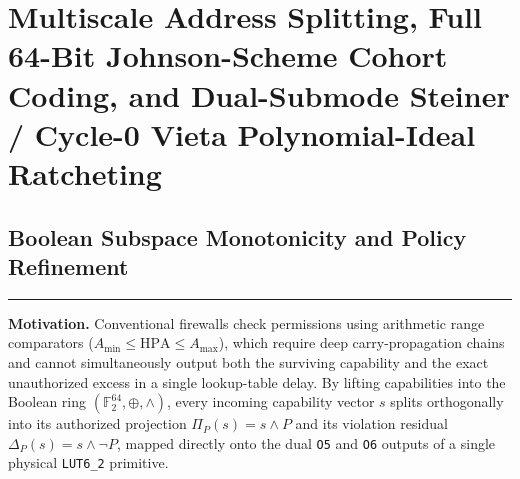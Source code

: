 \documentclass[10pt,twocolumn]{article}
\makeatletter
\newif\ifspecintwocol \specintwocolfalse
\newif\ifspecresume   \specresumefalse
\newcommand{\StopTwoCol}{%
  \if@twocolumn
    \onecolumn
    \global\specintwocolfalse
    \let\spec@next\@empty
  \else
    \ifspecintwocol
      \global\specintwocolfalse
      \def\spec@next{\end{multicols}}%
    \else
      \let\spec@next\@empty
    \fi
  \fi
  \spec@next
}
\newcommand{\BeginConnesPlate}{%
  \if@twocolumn
    \onecolumn
    \global\specresumetrue
    \let\spec@platepre\@empty
  \else
    \ifspecintwocol
      \global\specresumetrue
      \let\spec@platepre\StopTwoCol
    \else
      \global\specresumefalse
      \let\spec@platepre\@empty
    \fi
  \fi
  \spec@platepre
  \par\vspace{4pt}\noindent\textcolor{black!25}{\rule{\textwidth}{0.4pt}}\par\vspace{3pt}%
}
\theoremstyle{spectralthm}
\makeatother
\begin{document}
\StopTwoCol
\section{Multiscale Address Splitting, Full 64-Bit Johnson-Scheme Cohort Coding, and Dual-Submode Steiner / Cycle-0 Vieta Polynomial-Ideal Ratcheting}
\label{sec:multiscale}

\subsection{Boolean Subspace Monotonicity and Policy Refinement}
\BeginConnesPlate
\noindent\textbf{Motivation.}\; Conventional firewalls check permissions using arithmetic range comparators ($A_{\min} \le \mathrm{HPA} \le A_{\max}$), which require deep carry-propagation chains and cannot simultaneously output both the surviving capability and the exact unauthorized excess in a single lookup-table delay. By lifting capabilities into the Boolean ring $(\mathbb{F}_2^{64}, \oplus, \wedge)$, every incoming capability vector $s$ splits orthogonally into its authorized projection $\Pi_P(s) = s \wedge P$ and its violation residual $\Delta_P(s) = s \wedge \neg P$, mapped directly onto the dual \texttt{O5} and \texttt{O6} outputs of a single physical \mbox{\texttt{LUT6\_2}} primitive.
\end{document}
